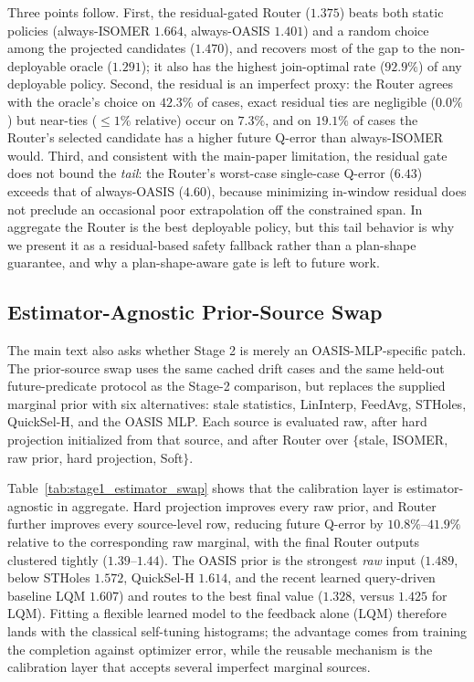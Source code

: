 \documentclass[11pt]{article}
\begin{document}


Three points follow. First, the residual-gated Router ($1.375$) beats both static policies
(always-ISOMER $1.664$, always-OASIS $1.401$) and a random choice among the projected
candidates ($1.470$), and recovers most of the gap to the non-deployable oracle ($1.291$);
it also has the highest join-optimal rate ($92.9\%$) of any deployable policy. Second, the
residual is an imperfect proxy: the Router agrees with the oracle's choice on $42.3\%$ of
cases, exact residual ties are negligible ($0.0\%$) but near-ties ($\le 1\%$ relative)
occur on $7.3\%$, and on $19.1\%$ of cases the Router's selected candidate has a higher
future Q-error than always-ISOMER would. Third, and consistent with the main-paper
limitation, the residual gate does not bound the \emph{tail}: the Router's worst-case
single-case Q-error ($6.43$) exceeds that of always-OASIS ($4.60$), because minimizing
in-window residual does not preclude an occasional poor extrapolation off the constrained
span. In aggregate the Router is the best deployable policy, but this tail behavior is why
we present it as a residual-based safety fallback rather than a plan-shape guarantee, and
why a plan-shape-aware gate is left to future work.

\subsection{Estimator-Agnostic Prior-Source Swap}

The main text also asks whether Stage 2 is merely an OASIS-MLP-specific patch.
The prior-source swap uses the same cached drift cases and the same held-out
future-predicate protocol as the Stage-2 comparison, but replaces the supplied
marginal prior with six alternatives: stale statistics, LinInterp, FeedAvg,
STHoles, QuickSel-H, and the OASIS MLP. Each source is evaluated raw, after hard
projection initialized from that source, and after Router over
$\{$stale, ISOMER, raw prior, hard projection, Soft$\}$.



Table~\ref{tab:stage1_estimator_swap} shows that the calibration layer is
estimator-agnostic in aggregate. Hard projection improves every raw prior, and
Router further improves every source-level row, reducing future Q-error by
$10.8\%$--$41.9\%$ relative to the corresponding raw marginal, with the final Router
outputs clustered tightly ($1.39$--$1.44$). The OASIS prior is the strongest \emph{raw}
input ($1.489$, below STHoles $1.572$, QuickSel-H $1.614$, and the recent learned
query-driven baseline LQM $1.607$) and routes to the best final value ($1.328$, versus
$1.425$ for LQM). Fitting a flexible learned model to the feedback alone (LQM) therefore
lands with the classical self-tuning histograms; the advantage comes from training the
completion against optimizer error, while the reusable mechanism is the calibration layer
that accepts several imperfect marginal sources.
\end{document}
